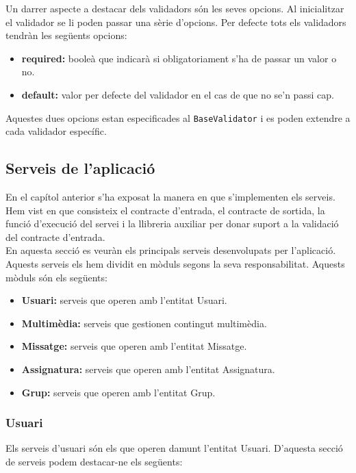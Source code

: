 	 Un darrer aspecte a destacar dels validadors són les seves opcions. Al inicialitzar el validador se li poden passar una sèrie d'opcions. Per defecte tots els validadors tendràn les següents opcions:
	 
	 \begin{itemize}
	 	\item \textbf{required:} booleà que indicarà si obligatoriament s'ha de passar un valor o no.
	 	\item \textbf{default:} valor per defecte del validador en el cas de que no se'n passi cap.
	 \end{itemize}
	 
	 Aquestes dues opcions estan especificades al \texttt{BaseValidator} i es poden extendre a cada validador específic.
	 
	\subsection{Serveis de l'aplicació}
	
		En el capítol anterior s'ha exposat la manera en que s'implementen els serveis. Hem vist en que consisteix el contracte d'entrada, el contracte de sortida, la funció d'execució del servei i la llibreria auxiliar per donar suport a la validació del contracte d'entrada.\\
		
		En aquesta secció es veuràn els principals serveis desenvolupats per l'aplicació. Aquests serveis els hem dividit en mòduls segons la seva responsabilitat. Aquests mòduls són els següents:
		
		\begin{itemize}
			\item \textbf{Usuari:} serveis que operen amb l'entitat Usuari.
			\item \textbf{Multimèdia:} serveis que gestionen contingut multimèdia.
			\item \textbf{Missatge:} serveis que operen amb l'entitat Missatge.
			\item \textbf{Assignatura:} serveis que operen amb l'entitat Assignatura.
			\item \textbf{Grup:} serveis que operen amb l'entitat Grup.
		\end{itemize}
		\subsubsection{Usuari}
			
		Els serveis d'usuari són els que operen damunt l'entitat Usuari. D'aquesta secció de serveis podem destacar-ne els següents:
		
